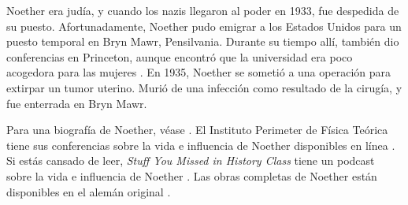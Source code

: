 \documentclass[../../../include/open-logic-section]{subfiles}
\begin{document}
Noether era judía, y cuando los nazis llegaron al poder en 1933, fue despedida de su puesto. Afortunadamente, Noether pudo emigrar a los Estados Unidos para un puesto temporal en Bryn Mawr, Pensilvania. Durante su tiempo allí, también dio conferencias en Princeton, aunque encontró que la universidad era poco acogedora para las mujeres \citep[81]{Dick1981}. En 1935, Noether se sometió a una operación para extirpar un tumor uterino. Murió de una infección como resultado de la cirugía, y fue enterrada en Bryn Mawr.

\begin{reading}
Para una biografía de Noether, véase \citet{Dick1981}. El Instituto Perimeter de Física Teórica tiene sus conferencias sobre la vida e influencia de Noether disponibles en línea \citep{Perimeter2015}. Si estás cansado de leer, \emph{Stuff You Missed in History Class} tiene un podcast sobre la vida e influencia de Noether \citep{Frey2015}. Las obras completas de Noether están disponibles en el alemán original \citep{Noether1983}.
\end{reading}
\end{document}
